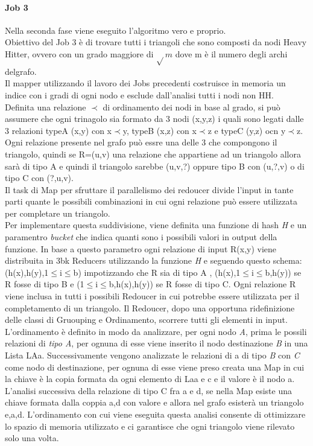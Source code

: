 \documentclass[paper=a4, fontsize=11pt]{scrartcl}	%
\numberwithin{equation}{section}															%
\numberwithin{figure}{section}																%
\numberwithin{table}{section}																%
\begin{document}
\paragraph{Job 3}
Nella seconda fase viene eseguito l'algoritmo vero e proprio.\\
Obiettivo del Job 3 è di trovare tutti i triangoli che sono composti da nodi Heavy Hitter, ovvero con un grado maggiore di $\sqrt{} m$ dove m è il numero degli archi delgrafo.\\
Il mapper utilizzando il lavoro dei Jobs precedenti costruisce in memoria un indice con i gradi di ogni nodo e esclude dall'analisi tutti i nodi non HH.\\
Definita una relazione $\prec$ di ordinamento dei nodi in base al grado, si può assumere che ogni trinagolo sia formato da 3 nodi (x,y,z) i quali sono legati dalle 3 relazioni typeA (x,y) con x$\prec$y, typeB (x,z) con x$\prec$z e typeC (y,z) ocn y$\prec$z.\\
Ogni relazione presente nel grafo può essre una delle 3 che compongono il triangolo, quindi se R=(u,v) una relazione che appartiene ad un triangolo allora sarà di tipo A e quindi  il triangolo sarebbe (u,v,?) oppure tipo B con (u,?,v) o di tipo C con (?,u,v).\\
Il task di Map per sfruttare il parallelismo dei redoucer divide l'input in tante parti quante le possibili combinazioni in cui ogni relazione può essere utilizzata per completare un triangolo.\\
Per implementare questa suddivisione, viene definita una funzione di hash \textit{H} e un paramentro \textit{bucket} che indica quanti sono i possibili valori in output della funzione. In base a questo parametro ogni relazione di input R(x,y) viene distribuita in 3bk Reducers utilizzando la funzione \textit{H} e seguendo questo schema: (h(x),h(y),1$\leq$i$\leq$b) impotizzando che R sia di tipo A , (h(x),1$\leq$i$\leq$b,h(y)) se R fosse di tipo B e (1$\leq$i$\leq$b,h(x),h(y)) se R fosse di tipo C. Ogni relazione R viene inclusa in tutti i possibili Redoucer in cui potrebbe essere utilizzata per il completamento di un triangolo.
Il Redoucer, dopo una opportuna ridefinizione delle classi di Gruouping e Ordinamento, scorrere tutti gli elementi in input. L'ordinamento è definito in modo da analizzare, per ogni nodo \textit{A}, prima le possili relazioni di \textit{tipo A}, per ognuna di esse viene inserito il nodo destinazione \textit{B} in una Lista LAa. Successivamente vengono analizzate le relazioni di a di tipo \textit{B} con \textit{C} come nodo di destinazione, per ognuna di esse viene preso creata una Map in cui la chiave è la copia formata da ogni elemento di Laa e c e il valore è il nodo a.
L'analisi successiva della relazione di tipo C fra a e d, se nella Map esiste una chiave formata dalla coppia a,d con valore e allora nel grafo esisterà un triangolo e,a,d.
L'ordinamento con cui viene eseguita questa analisi consente di ottimizzare lo spazio di memoria utilizzato e ci garantisce che ogni triangolo viene rilevato solo una volta.
\end{document}
